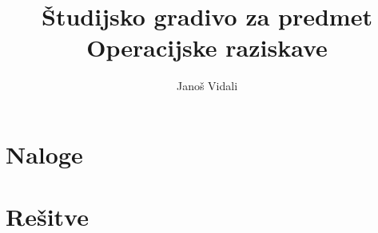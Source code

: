 \documentclass[a4paper, 11pt, titlepage]{article}
\begin{document}
\title{Študijsko gradivo za predmet Operacijske raziskave}
\author{Janoš Vidali}
\maketitle

\setcounter{tocdepth}{2}
\tableofcontents

\clearpage

\section{Naloge}
{


}

\clearpage

\section{Rešitve}
{


}

\clearpage



\end{document}
